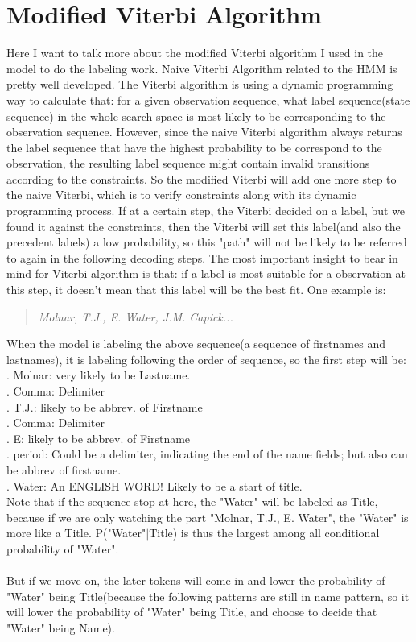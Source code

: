 \documentclass[11pt]{article}
\begin{document}
\section{Modified Viterbi Algorithm}
Here I want to talk more about the modified Viterbi algorithm I used in the model to do the labeling work. Naive Viterbi Algorithm related to the HMM is pretty well developed. The Viterbi algorithm is using a dynamic programming way to calculate that: for a given observation sequence, what label sequence(state sequence) in the whole search space is most likely to be corresponding to the observation sequence. However, since the naive Viterbi algorithm always returns the label sequence that have the highest probability to be correspond to the observation, the resulting label sequence might contain invalid transitions according to the constraints. So the modified Viterbi will add one more step to the naive Viterbi, which is to verify constraints along with its dynamic programming process. If at a certain step, the Viterbi decided on a label, but we found it against the constraints, then the Viterbi will set this label(and also the precedent labels) a low probability, so this "path" will not be likely to be referred to again in the following decoding steps. The most important insight to bear in mind for Viterbi algorithm is that: if a label is most suitable for a observation at this step, it doesn't mean that this label will be the best fit. One example is: 
\begin{quotation}
\textit{
	Molnar, T.J., E. Water, J.M. Capick...
}
\end{quotation}
When the model is labeling the above sequence(a sequence of firstnames and lastnames), it is labeling following the order of sequence, so the first step will be:\\
. Molnar: very likely to be Lastname.\\
. Comma: Delimiter\\
. T.J.: likely to be abbrev. of Firstname\\
. Comma: Delimiter\\
. E: likely to be abbrev. of Firstname\\
. period: Could be a delimiter, indicating the end of the name fields; but also can be abbrev of firstname. \\
. Water: An ENGLISH WORD! Likely to be a start of title. \\
Note that if the sequence stop at here, the "Water" will be labeled as Title, because if we are only watching the part "Molnar, T.J., E.  Water", the "Water" is more like a Title. P("Water"$\left\vert\right.$Title) is thus the largest among all conditional probability of "Water".\\\\
But if we move on, the later tokens will come in and lower the probability of "Water" being Title(because the following patterns are still in name pattern, so it will lower the probability of "Water" being Title, and choose to decide that "Water" being Name).
\end{document}
